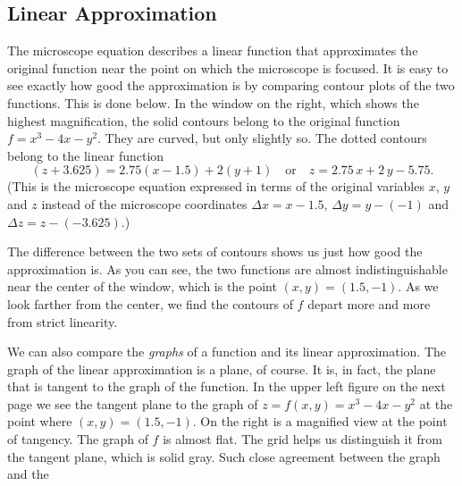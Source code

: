 {{{{%
\subsection{Linear Approximation}

	The microscope equation 
describes a linear function that approximates the original function near the point on which the microscope is focused.  It is easy to see exactly how good the approximation is by comparing contour plots of the two functions.  This is done below.  In the window on the right, which shows the highest magnification, the solid contours belong to the original function $f = x^3 - 4x - y^2$.  They are curved, but only slightly so.  The dotted contours belong to the linear function
	\[
(z + 3.625) = 2.75 (x - 1.5) + 2 (y + 1) \quad \mbox{or} \quad
		z = 2.75 \, x + 2 \, y - 5.75.
\]
(This is the microscope equation expressed in terms of the original variables $x$, $y$ and $z$ instead of the microscope coordinates $\Delta x = x - 1.5$, $\Delta y = y - (-1)$ and $\Delta z = z - (-3.625)$.)  

	The
difference between the two sets of contours shows us just how good the approximation is.  As you can see, the two functions are almost indistinguishable near the center of the window, which is the point $(x, y) = (1.5, -1)$.  As we look farther from the center, we find the contours of $f$ depart more and more from strict linearity.  

\vspace{153pt}

	We can also compare the {\em graphs\/} of a function and its linear approximation.  The graph of the linear approximation is a plane, of course.  It is, in fact, the plane that is tangent to the graph of the function.  	
In the upper left figure on the next page we see the tangent plane to the graph of $z = f(x, y) = x^3 - 4x -y^2$ at the point where $(x, y) = (1.5, -1)$.  On the right is a magnified view at the point of tangency.  The graph of $f$ is almost flat.  The grid helps us distinguish it from the tangent plane, which is solid gray.  Such close agreement between the graph and the 
\linebreak
\pagebreak

}}}}
